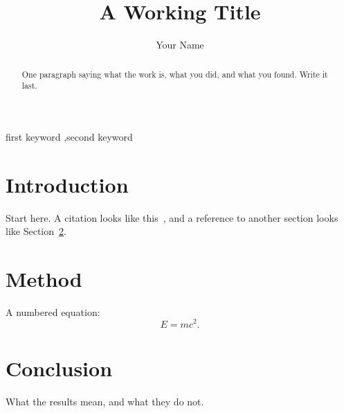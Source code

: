 \documentclass[a4paper,fleqn]{cas-sc}
\begin{document}

\title [mode = title]{A Working Title}

\author[1]{Your Name}

\begin{abstract}
One paragraph saying what the work is, what you did, and what you found.
Write it last.
\end{abstract}

\begin{keywords}
first keyword \sep second keyword
\end{keywords}

\maketitle

\section{Introduction}
\label{sec:introduction}

Start here.  A citation looks like this~\cite{knuth1984}, and a reference to
another section looks like Section~\ref{sec:method}.

\section{Method}
\label{sec:method}

A numbered equation:
\begin{equation}
  \label{eq:example}
  E = mc^2.
\end{equation}

\section{Conclusion}

What the results mean, and what they do not.



\end{document}

